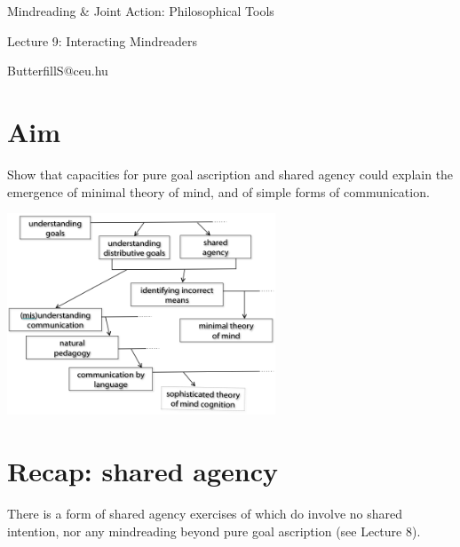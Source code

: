\documentclass[11pt]{extarticle}
\date{}
\begin{document}
\begin{multicols}{3}

\setlength\footnotesep{1em}









\begin{center}
{\Large
Mindreading \& Joint Action: Philosophical Tools}

Lecture 9: Interacting Mindreaders


ButterfillS@ceu.hu
\end{center}


\section{Aim}
Show that capacities for pure goal ascription and shared agency could explain the emergence of minimal theory of mind, and of simple forms of communication.



\begin{center}
\includegraphics[width=8cm]{fig_emergence.png}

\end{center}



\section{Recap: shared agency}
There is a form of shared agency exercises of which do involve no shared intention, nor any mindreading beyond pure goal ascription (see Lecture 8).




\end{multicols}
\end{document}
